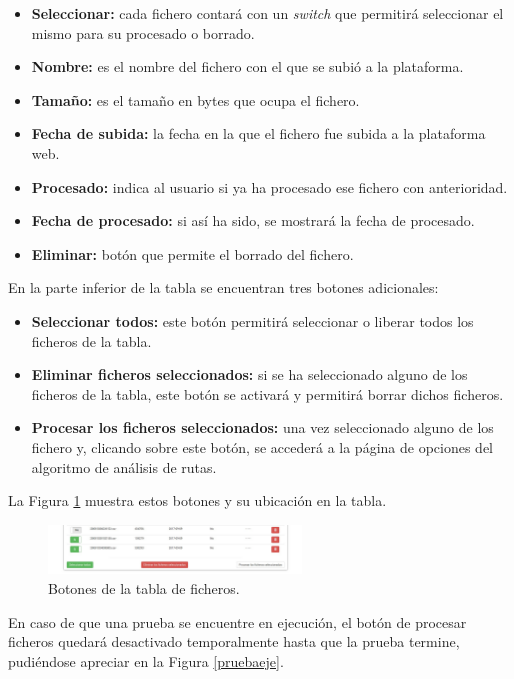 \begin{itemize}
	\item \textbf{Seleccionar:} cada fichero contará con un \textit{switch} que permitirá seleccionar el mismo para su procesado o borrado.
	\item \textbf{Nombre:} es el nombre del fichero con el que se subió a la plataforma. 
	\item \textbf{Tamaño:} es el tamaño en bytes que ocupa el fichero.
	\item \textbf{Fecha de subida:} la fecha en la que el fichero fue subida a la plataforma web.
	\item \textbf{Procesado:} indica al usuario si ya ha procesado ese fichero con anterioridad.
	\item \textbf{Fecha de procesado:} si así ha sido, se mostrará la fecha de procesado.
	\item \textbf{Eliminar:} botón que permite el borrado del fichero.
\end{itemize}

En la parte inferior de la tabla se encuentran tres botones adicionales:

\begin{itemize}
	\item \textbf{Seleccionar todos:} este botón permitirá seleccionar o liberar todos los ficheros de la tabla.
	\item \textbf{Eliminar ficheros seleccionados:} si se ha seleccionado alguno de los ficheros de la tabla, este botón se activará y permitirá borrar dichos ficheros.
	\item \textbf{Procesar los ficheros seleccionados:} una vez seleccionado alguno de los fichero y, clicando sobre este botón, se accederá a la página de opciones del algoritmo de análisis de rutas.
\end{itemize}

La Figura \ref{filetableend} muestra estos botones y su ubicación en la tabla.

\begin{figure}[h]
  \centering
    \includegraphics[width=0.6\textwidth]{../img/manualusuario/filetableend.jpg}
  \caption{Botones de la tabla de ficheros.}
  \label{filetableend}
\end{figure}

En caso de que una prueba se encuentre en ejecución, el botón de procesar ficheros quedará desactivado temporalmente hasta que la prueba termine, pudiéndose apreciar en la Figura \ref{pruebaeje}.

